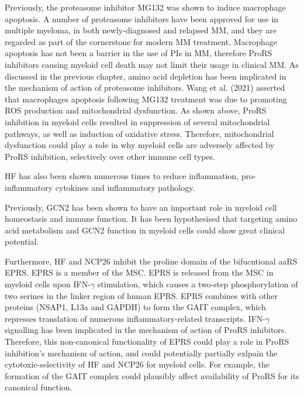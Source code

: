 Previously, the proteasome inhibitor MG132 was shown to induce macrophage apoptosis\cite{wang2021proteasome}.
A number of proteasome inhibitors have been approved for use in multiple myeloma, in both newly-diagnosed and relapsed MM, and they are regarded as part of the cornerstone for modern MM treatment.
Macrophage apoptosis has not been a barrier in the use of PIs in MM, therefore ProRS inhibitors causing myeloid cell death may not limit their usage in clinical MM\@.
As discussed in the previous chapter, amino acid depletion has been implicated in the mechanism of action of proteasome inhibitors.
Wang et al. (2021) asserted that macrophages apoptosis following MG132 treatment was due to promoting ROS production and mitochondrial dysfunction\cite{wang2021proteasome}.
As shown above, ProRS inhibition in myeloid cells resulted in suppression of several mitochondrial pathways, as well as induction of oxidative stress.
Therefore, mitochondrial dysfunction could play a role in why myeloid cells are adversely affected by ProRS inhibition, selectively over other immune cell types.

HF has also been shown numerous times to reduce inflammation, pro-inflammatory cytokines and inflammatory pathology.

Previously, GCN2 has been shown to have an important role in myeloid cell homeostasis and immune function.
It has been hypothesised that targeting amino acid metabolism and GCN2 function in myeloid cells could show great clinical potential\cite{liu2014role}.


Furthermore, HF and NCP26 inhibit the proline domain of the bifucntional aaRS EPRS\@.
EPRS is a member of the MSC.
EPRS is released from the MSC in myeloid cells upon IFN-$\gamma$ stimulation, which causes a two-step phosphorylation of two serines in the linker region of human EPRS\cite{arif2009two}.
EPRS combines with other proteins (NSAP1, L13a and GAPDH) to form the GAIT complex, which represses translation of numerous inflammatory-related transcripts\cite{arif2018gait}.
IFN-$\gamma$ signalling has been implicated in the mechanism of action of ProRS inhibitors\cite{cheng2012halofugine}.
Therefore, this non-canonical functionality of EPRS could play a role in ProRS inhibition's mechanism of action, and could potentially partially exlpain the cytotoxic-selectivity of HF and NCP26 for myeloid cells.
For example, the formation of the GAIT complex could plausibly affect availability of ProRS for its canonical function.

